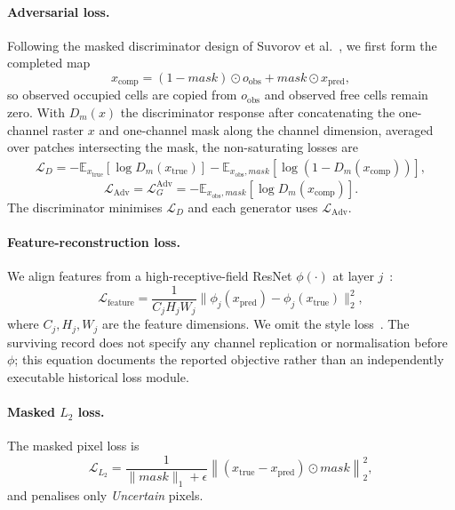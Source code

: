 \documentclass[11pt]{article}
\begin{document}
\paragraph{Adversarial loss.}
Following the masked discriminator design of Suvorov et al.~\citep{suvorov2021resolution}, we first form the completed map
\begin{equation}
	x_{\text{comp}}=(1-\textit{mask})\odot o_{\text{obs}}+\textit{mask}\odot x_{\text{pred}},
\end{equation}
so observed occupied cells are copied from $o_{\text{obs}}$ and observed free cells remain zero. With $D_m(x)$ the discriminator response after concatenating the one-channel raster $x$ and one-channel mask along the channel dimension, averaged over patches intersecting the mask, the non-saturating losses are
\begin{equation}
	\begin{aligned}
		\mathcal{L}_{D} =
		-\mathbb{E}_{x_{\text{true}}}\!\left[\log D_m(x_{\text{true}})\right]
		-\mathbb{E}_{x_{\text{obs}},\textit{mask}}\!\left[\log\!\left(1-D_m(x_{\text{comp}})\right)\right],
	\end{aligned}
\end{equation}
\begin{equation}
	\mathcal{L}_{\text{Adv}}
	=
	\mathcal{L}_{G}^{\text{Adv}}
	=
	-\mathbb{E}_{x_{\text{obs}},\textit{mask}}\!\left[\log D_m(x_{\text{comp}})\right].
\end{equation}
The discriminator minimises $\mathcal{L}_D$ and each generator uses $\mathcal{L}_{\text{Adv}}$.

\paragraph{Feature-reconstruction loss.}
We align features from a high-receptive-field ResNet $\phi(\cdot)$ at layer $j$~\citep{chi2020fast,he2016deep}:
\begin{equation}
	\mathcal{L}_{\mathrm{feature}}=\frac{1}{C_j H_j W_j}\|\phi_{j}(x_{\mathrm{pred}})-\phi_{j}(x_{\mathrm{true}})\|^2_2 ,
\end{equation}
where $C_j,H_j,W_j$ are the feature dimensions. We omit the style loss~\citep{johnson2016perceptual}. The surviving record does not specify any channel replication or normalisation before $\phi$; this equation documents the reported objective rather than an independently executable historical loss module.

\paragraph{Masked $L_2$ loss.}
The masked pixel loss is
\begin{equation}
	\mathcal{L}_{L_2} = \frac{1}{\|\textit{mask}\|_1+\epsilon} \left\| (x_{\text{true}} - x_{\text{pred}}) \odot \textit{mask} \right\|_2^2 ,
\end{equation}
and penalises only \emph{Uncertain} pixels.
\end{document}
